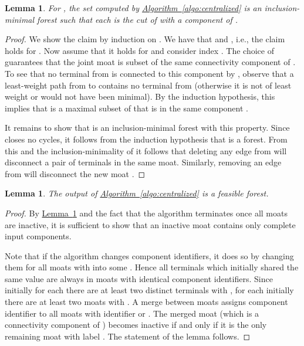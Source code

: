 \documentclass[letterpaper,11pt]{article}
\newtheorem{lemma}[theorem]{Lemma}
\newcommand{\namedref}[2]{\hyperref[#2]{#1~\ref*{#2}}}
\newcommand{\lemmaref}[1]{\namedref{Lemma}{#1}}
\newcommand{\algref}[1]{\namedref{Algorithm}{#1}}
\begin{document}
\begin{lemma}\label{lemma:components}
For , the set  computed by
\algref{algo:centralized} is an inclusion-minimal forest such that each  is the cut of  with a component of .
\end{lemma}
\begin{proof} We show the claim by induction on . We have that 
and , i.e., the claim holds for . Now assume that it holds
for  and consider index . The choice of
 guarantees that the joint moat
 is subset of the same connectivity
component of . To see that no terminal from  is connected to this component by
, observe that a least-weight path from  to  contains
no terminal from  (otherwise
it is not of least weight or  would not have been minimal). By the
induction hypothesis, this implies that 
is a maximal subset of  that is in the same component .

It remains to show that  is an inclusion-minimal forest with this
property. Since  closes no cycles, it follows from the
induction hypothesis that  is a forest. From this and the
inclusion-minimality of  it follows that deleting any edge from  will
disconnect a pair of terminals in the same moat. Similarly, removing an edge
from  will disconnect the new moat .
\end{proof}

\begin{lemma}\label{lemma:feasible}
The output  of \algref{algo:centralized} is a feasible forest.
\end{lemma}
\begin{proof}
By \lemmaref{lemma:components} and the fact that the algorithm terminates once
all moats are inactive, it is sufficient to show that an inactive moat contains
only complete input components.

Note that if the algorithm changes component identifiers, it does so by changing
them for all moats  with  into some
. Hence all terminals  which initially shared
the same value  are always in moats with identical component
identifiers. Since initially for each  there are at least two
distinct terminals  with , for each 
initially there are at least two moats  with . A
merge between moats  assigns component identifier  to
all moats with identifier  or . The merged moat (which
is a connectivity component of ) becomes inactive if and only if it is
the only remaining moat with label . The statement of the lemma
follows.
\end{proof}
\end{document}
